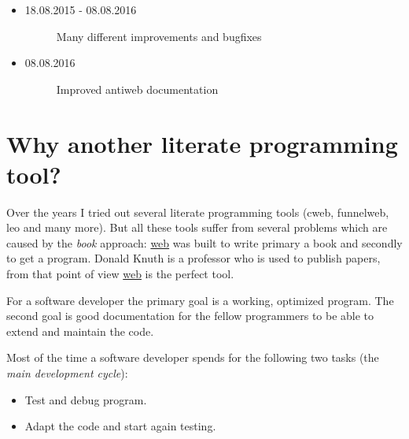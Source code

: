 \documentclass[letterpaper,10pt,english]{sphinxmanual}
\begin{document}
\begin{itemize}
\begin{description}
\end{description}

\item {} \begin{description}
\item[{18.08.2015 - 08.08.2016}] \leavevmode
Many different improvements and bugfixes

\end{description}

\item {} \begin{description}
\item[{08.08.2016}] \leavevmode
Improved antiweb documentation

\end{description}

\end{itemize}


\chapter{Why another literate programming tool?}
\label{motivation::doc}\label{motivation:why-another-literate-programming-tool}
Over the years I tried out several literate programming tools (cweb, funnelweb, leo and many more).
But all these tools suffer from several problems which are caused by
the \emph{book} approach: \href{http://en.wikipedia.org/wiki/WEB}{web} was built to write primary a book and secondly
to get a program.  Donald Knuth is a professor who is used to publish papers,
from that point of view \href{http://en.wikipedia.org/wiki/WEB}{web} is the perfect tool.

For a software developer the primary goal is a working, optimized program.
The second goal is good documentation for the fellow programmers to be able to
extend and maintain the code.

Most of the time a software developer spends for the following two tasks
(the \emph{main development cycle}):
\begin{itemize}
\item {} 
Test and debug program.

\item {} 
Adapt the code and start again testing.

\end{itemize}
\end{document}
